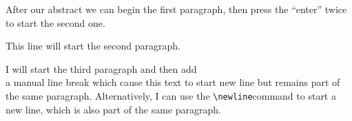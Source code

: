 \documentclass{article}
\begin{document}
\begin{abstract}
This is a simple paragraph at the beginning of the document. A bried introduction about the main subject.
\end{abstract}


After our abstract we can begin the first paragraph, then press the ``enter'' twice to start the second one.


This line will start the second paragraph.


I will start the third paragraph and then add \\ a manual line break which cause this text to start new line 
but remains part of the same paragraph. Alternatively, I can use the \verb|\newline|\newline command to start a new line,
which is also part of the same paragraph.
\end{document}
